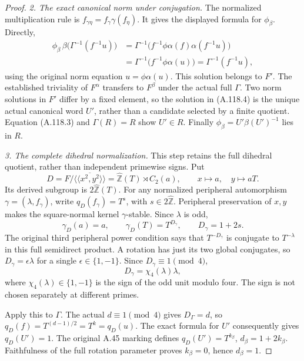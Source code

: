 \begin{proof}
\medskip\noindent\emph{2. The exact canonical norm under conjugation.}
The normalized multiplication rule is
\(f_{\gamma\eta}=f_\gamma\gamma(f_\eta)\).
It gives the displayed formula for \(\phi_\beta\). Directly,
\[
 \begin{aligned}
 \phi_\beta\,\beta\bigl(\Gamma^{-1}(f^{-1}u)\bigr)
 &=\Gamma^{-1}\bigl(
 f^{-1}\phi\alpha(f)\alpha(f^{-1}u)\bigr)\\
 &=\Gamma^{-1}\bigl(f^{-1}\phi\alpha(u)\bigr)
 =\Gamma^{-1}(f^{-1}u),
 \end{aligned}                                                   \tag{A.118.4}
\]
using the original norm equation \(u=\phi\alpha(u)\).
This solution belongs to \(F'\). The established triviality of
\(F^\alpha\) transfers to \(F^\beta\) under the actual full
\(\Gamma\). Two norm solutions in \(F'\) differ by a fixed
element, so the solution in (A.118.4) is the unique actual canonical
word \(U'\), rather than a candidate selected by a finite quotient.
Equation (A.118.3) and \(\Gamma(R)=R\) show \(U'\in R\).
Finally \(\phi_\beta=U'\beta(U')^{-1}\) lies in \(R\).

\medskip\noindent\emph{3. The complete dihedral normalization.}
This step retains the full dihedral quotient, rather than independent
primewise signs. Put
\[
 D=F/\overline{\langle\!\langle x^2,y^2\rangle\!\rangle}
   =\widehat{\mathbb Z}(T)\rtimes C_2(a),\qquad
 x\mapsto a,\quad y\mapsto aT.
\]
Its derived subgroup is \(2\widehat{\mathbb Z}(T)\).
For any normalized peripheral automorphism \(\gamma=(\lambda,f_\gamma)\),
write \(q_D(f_\gamma)=T^s\), with \(s\in2\widehat{\mathbb Z}\).
Peripheral preservation of \(x,y\) makes the square-normal kernel
\(\gamma\)-stable. Since \(\lambda\) is odd,
\[
 \gamma_D(a)=a,\qquad
 \gamma_D(T)=T^{D_\gamma},\qquad D_\gamma=1+2s.
\]
The original third peripheral power condition says that
\(T^{-D_\gamma}\) is conjugate to \(T^{-\lambda}\) in this full
semidirect product. A rotation has just its two global conjugates,
so \(D_\gamma=\epsilon\lambda\) for a single
\(\epsilon\in\{1,-1\}\). Since \(D_\gamma\equiv1\pmod4\),
\[
 D_\gamma=\chi_4(\lambda)\lambda,                            \tag{A.118.5}
\]
where \(\chi_4(\lambda)\in\{1,-1\}\) is the sign of the odd
unit modulo four. The sign is not chosen separately at different
primes.

Apply this to \(\Gamma\). The actual \(d\equiv1\pmod4\) gives
\(D_\Gamma=d\), so \(q_D(f)=T^{(d-1)/2}=T^k=q_D(u)\).
The exact formula for \(U'\) consequently gives \(q_D(U')=1\).
The original A.45 marking defines
\(q_D(U')=T^{k_\beta}\), \(d_\beta=1+2k_\beta\).
Faithfulness of the full rotation parameter proves
\(k_\beta=0\), hence \(d_\beta=1\).


\end{proof}
